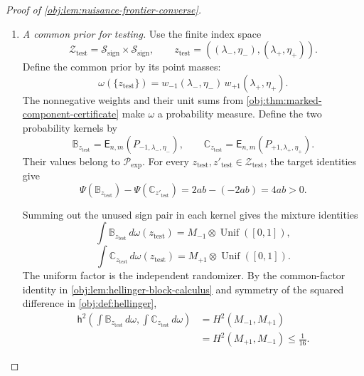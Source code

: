 \documentclass[11pt]{article}
\begin{document}
\begin{proof}[Proof of \cref{obj:lem:nuisance-frontier-converse}]
\begin{enumerate}
We may consequently define a functional on all nonnegative Borel measures on \(\Omega_{\mathrm{obs}}\) by
\[
\Psi(\mathbb P)=
\begin{cases}
\tau_{P_{\theta,\lambda,\eta}}(x_0),
&
\mathbb P=\mathsf E_{n,m}(P_{\theta,\lambda,\eta})
\text{ for some }
\theta\in\{-1,+1\},\
(\lambda,\eta)\in\mathcal S_{\mathrm{sign}},\\
0,&\mathbb P\notin\mathcal P_{\mathrm{exp}}.
\end{cases}
\]
The equality just proved makes the first case independent of the representative. Thus
\[
\Psi\bigl(\mathsf E_{n,m}(P_{\theta,\lambda,\eta})\bigr)
=\tau_{P_{\theta,\lambda,\eta}}(x_0)
\]
throughout the marked family.

\item \textit{A common prior for testing.}
Use the finite index space
\[
\mathcal Z_{\mathrm{test}}
=\mathcal S_{\mathrm{sign}}\times\mathcal S_{\mathrm{sign}},
\qquad
z_{\mathrm{test}}
=((\lambda_-,\eta_-),(\lambda_+,\eta_+)).
\]
Define the common prior by its point masses:
\[
\omega(\{z_{\mathrm{test}}\})
=
w_{-1}(\lambda_-,\eta_-)\,
w_{+1}(\lambda_+,\eta_+).
\]
The nonnegative weights and their unit sums from \cref{obj:thm:marked-component-certificate} make \(\omega\) a probability measure. Define the two probability kernels by
\[
\mathbb B_{z_{\mathrm{test}}}
=\mathsf E_{n,m}(P_{-1,\lambda_-,\eta_-}),
\qquad
\mathbb C_{z_{\mathrm{test}}}
=\mathsf E_{n,m}(P_{+1,\lambda_+,\eta_+}).
\]
Their values belong to \(\mathcal P_{\mathrm{exp}}\). For every
\(z_{\mathrm{test}},z'_{\mathrm{test}}\in\mathcal Z_{\mathrm{test}}\), the target identities give
\[
\Psi(\mathbb B_{z_{\mathrm{test}}})
-\Psi(\mathbb C_{z'_{\mathrm{test}}})
=2ab-(-2ab)=4ab>0.
\]

Summing out the unused sign pair in each kernel gives the mixture identities
\[
\int\mathbb B_{z_{\mathrm{test}}}\,d\omega(z_{\mathrm{test}})
=M_{-1}\otimes\operatorname{Unif}([0,1]),
\]
\[
\int\mathbb C_{z_{\mathrm{test}}}\,d\omega(z_{\mathrm{test}})
=M_{+1}\otimes\operatorname{Unif}([0,1]).
\]
The uniform factor is the independent randomizer. By the common-factor identity in \cref{obj:lem:hellinger-block-calculus} and symmetry of the squared difference in \cref{obj:def:hellinger},
\[
\begin{aligned}
\mathsf h^2\left(
\int\mathbb B_{z_{\mathrm{test}}}\,d\omega,
\int\mathbb C_{z_{\mathrm{test}}}\,d\omega
\right)
&=H^2(M_{-1},M_{+1})\\
&=H^2(M_{+1},M_{-1})
\le\frac1{16}.
\end{aligned}
\]


\end{enumerate}
\end{proof}
\end{document}
